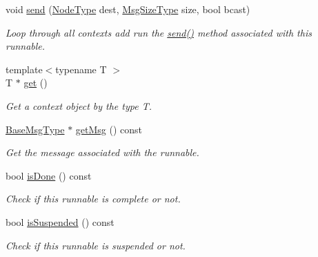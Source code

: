 \begin{DoxyCompactItemize}
void \hyperlink{structvt_1_1runnable_1_1_runnable_new_a997203eb54dc62151d11211384cf335f}{send} (\hyperlink{namespacevt_a866da9d0efc19c0a1ce79e9e492f47e2}{Node\+Type} dest, \hyperlink{namespacevt_a408e86a8c7c89309b52907dc5a513924}{Msg\+Size\+Type} size, bool bcast)
\begin{DoxyCompactList}\small\item\em Loop through all contexts add run the {\ttfamily \hyperlink{structvt_1_1runnable_1_1_runnable_new_a997203eb54dc62151d11211384cf335f}{send()}} method associated with this runnable. \end{DoxyCompactList}\item 
{\footnotesize template$<$typename T $>$ }\\T $\ast$ \hyperlink{structvt_1_1runnable_1_1_runnable_new_ab7cbde782a5ad0c67fa4c63f02e174ad}{get} ()
\begin{DoxyCompactList}\small\item\em Get a context object by the type {\ttfamily T}. \end{DoxyCompactList}\item 
\hyperlink{namespacevt_a44d0d4e144748f2b19a1cfd962f50338}{Base\+Msg\+Type} $\ast$ \hyperlink{structvt_1_1runnable_1_1_runnable_new_aed655dff826a821a3db9162259f33288}{get\+Msg} () const
\begin{DoxyCompactList}\small\item\em Get the message associated with the runnable. \end{DoxyCompactList}\item 
bool \hyperlink{structvt_1_1runnable_1_1_runnable_new_ad9acf28ef0fed7a7d63a9ca1d3ba3efc}{is\+Done} () const
\begin{DoxyCompactList}\small\item\em Check if this runnable is complete or not. \end{DoxyCompactList}\item 
bool \hyperlink{structvt_1_1runnable_1_1_runnable_new_af45b4443eee6dff57249bda0a9c2b7f0}{is\+Suspended} () const
\begin{DoxyCompactList}\small\item\em Check if this runnable is suspended or not. \end{DoxyCompactList}\end{DoxyCompactItemize}
